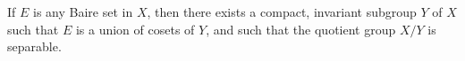 If $E$ is any Baire set in $X$, then there exists a compact, invariant subgroup $Y$ of $X$ such that $E$ is a union of cosets of $Y$, and such that the quotient group $X/Y$ is separable.